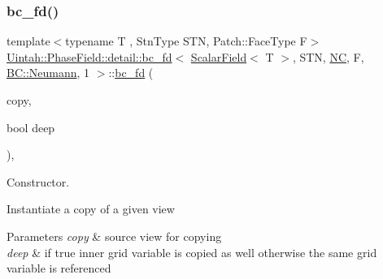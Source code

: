 \subsubsection{\texorpdfstring{bc\+\_\+fd()}{bc\_fd()}\hspace{0.1cm}{\footnotesize\ttfamily [1/3]}}
{\footnotesize\ttfamily template$<$typename T , Stn\+Type S\+TN, Patch\+::\+Face\+Type F$>$ \\
\hyperlink{classUintah_1_1PhaseField_1_1detail_1_1bc__fd}{Uintah\+::\+Phase\+Field\+::detail\+::bc\+\_\+fd}$<$ \hyperlink{structUintah_1_1PhaseField_1_1ScalarField}{Scalar\+Field}$<$ T $>$, S\+TN, \hyperlink{namespaceUintah_1_1PhaseField_a33d355affda78a83f45755ba8388cedda77924170fe82bfd58b74ca3e44139718}{NC}, F, \hyperlink{namespaceUintah_1_1PhaseField_a148fba372aa3be96fd6eede7a2fa10b5ab8537a769dbc90cb1762215441212152}{B\+C\+::\+Neumann}, 1 $>$\+::\hyperlink{classUintah_1_1PhaseField_1_1detail_1_1bc__fd}{bc\+\_\+fd} (\begin{DoxyParamCaption}\item[{const \hyperlink{classUintah_1_1PhaseField_1_1detail_1_1bc__fd}{bc\+\_\+fd}$<$ \hyperlink{structUintah_1_1PhaseField_1_1ScalarField}{Scalar\+Field}$<$ T $>$, S\+TN, \hyperlink{namespaceUintah_1_1PhaseField_a33d355affda78a83f45755ba8388cedda77924170fe82bfd58b74ca3e44139718}{NC}, F, \hyperlink{namespaceUintah_1_1PhaseField_a148fba372aa3be96fd6eede7a2fa10b5ab8537a769dbc90cb1762215441212152}{B\+C\+::\+Neumann}, 1 $>$ $\ast$}]{copy,  }\item[{bool}]{deep }\end{DoxyParamCaption})\hspace{0.3cm}{\ttfamily [inline]}, {\ttfamily [protected]}}



Constructor. 

Instantiate a copy of a given view


\begin{DoxyParams}{Parameters}
{\em copy} & source view for copying \\
\hline
{\em deep} & if true inner grid variable is copied as well otherwise the same grid variable is referenced \\
\hline
\end{DoxyParams}
\mbox{\label{classUintah_1_1PhaseField_1_1detail_1_1bc__fd_3_01ScalarField_3_01T_01_4_00_01STN_00_01NC_00_01F_00_01BC_1_1Neumann_00_011_01_4_a13e0083365b98a057de79df55981caa6}} 
